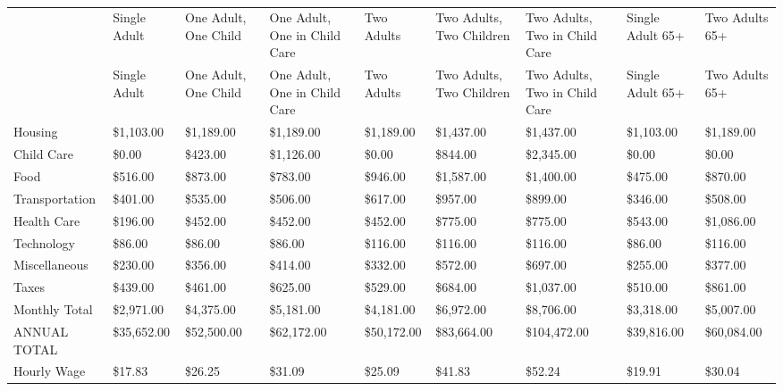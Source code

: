\documentclass[
  english,
  letterpaper,
]{report}
\begin{document}
\begin{longtable}[]{@{}lllllllll@{}}

\caption{\label{tbl-alice-budget}ALICE Household Survival Budget, New
York State, 2023}

\tabularnewline

\caption{}\label{T_4e519}\tabularnewline
\toprule\noalign{}
& Single Adult & One Adult, One Child & One Adult, One in Child Care &
Two Adults & Two Adults, Two Children & Two Adults, Two in Child Care &
Single Adult 65+ & Two Adults 65+ \\
\midrule\noalign{}
\endfirsthead
\toprule\noalign{}
& Single Adult & One Adult, One Child & One Adult, One in Child Care &
Two Adults & Two Adults, Two Children & Two Adults, Two in Child Care &
Single Adult 65+ & Two Adults 65+ \\
\midrule\noalign{}
\endhead
\bottomrule\noalign{}
\endlastfoot
Housing & \$1,103.00 & \$1,189.00 & \$1,189.00 & \$1,189.00 & \$1,437.00
& \$1,437.00 & \$1,103.00 & \$1,189.00 \\
Child Care & \$0.00 & \$423.00 & \$1,126.00 & \$0.00 & \$844.00 &
\$2,345.00 & \$0.00 & \$0.00 \\
Food & \$516.00 & \$873.00 & \$783.00 & \$946.00 & \$1,587.00 &
\$1,400.00 & \$475.00 & \$870.00 \\
Transportation & \$401.00 & \$535.00 & \$506.00 & \$617.00 & \$957.00 &
\$899.00 & \$346.00 & \$508.00 \\
Health Care & \$196.00 & \$452.00 & \$452.00 & \$452.00 & \$775.00 &
\$775.00 & \$543.00 & \$1,086.00 \\
Technology & \$86.00 & \$86.00 & \$86.00 & \$116.00 & \$116.00 &
\$116.00 & \$86.00 & \$116.00 \\
Miscellaneous & \$230.00 & \$356.00 & \$414.00 & \$332.00 & \$572.00 &
\$697.00 & \$255.00 & \$377.00 \\
Taxes & \$439.00 & \$461.00 & \$625.00 & \$529.00 & \$684.00 &
\$1,037.00 & \$510.00 & \$861.00 \\
Monthly Total & \$2,971.00 & \$4,375.00 & \$5,181.00 & \$4,181.00 &
\$6,972.00 & \$8,706.00 & \$3,318.00 & \$5,007.00 \\
ANNUAL TOTAL & \$35,652.00 & \$52,500.00 & \$62,172.00 & \$50,172.00 &
\$83,664.00 & \$104,472.00 & \$39,816.00 & \$60,084.00 \\
Hourly Wage & \$17.83 & \$26.25 & \$31.09 & \$25.09 & \$41.83 & \$52.24
& \$19.91 & \$30.04 \\

\end{longtable}
\end{document}
